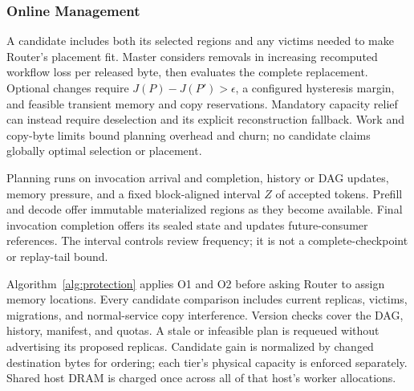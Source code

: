 \subsubsection{Online Management}
\label{sec:master-online}
\label{sec:execution}

A candidate includes both its selected regions and any victims needed
to make Router's placement fit. Master considers removals in increasing
recomputed workflow loss per released byte, then evaluates the complete
replacement. Optional changes require $J(P)-J(P')>\epsilon$, a configured
hysteresis margin, and feasible transient memory and copy reservations.
Mandatory capacity relief can instead require deselection and its
explicit reconstruction fallback. Work and copy-byte limits bound
planning overhead and churn; no candidate claims globally optimal
selection or placement.

Planning runs on invocation arrival and completion, history or DAG
updates, memory pressure, and a fixed block-aligned interval $Z$ of
accepted tokens. Prefill and decode offer immutable materialized regions
as they become available. Final invocation completion offers its sealed
state and updates future-consumer references. The interval controls
review frequency; it is not a complete-checkpoint or replay-tail bound.

Algorithm~\ref{alg:protection} applies O1 and O2 before asking Router to assign
memory locations. Every candidate comparison includes current replicas,
victims, migrations, and normal-service copy interference. Version checks
cover the DAG, history, manifest, and quotas. A stale or infeasible
plan is requeued without advertising its proposed replicas. Candidate
gain is normalized by changed destination bytes for ordering; each
tier's physical capacity is enforced separately. Shared host DRAM is
charged once across all of that host's worker allocations.


